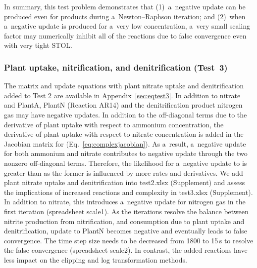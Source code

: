 \documentclass[gmdd, online, hvmath]{copernicus}
\begin{document}
      In summary, this test problem demonstrates that (1)~a~negative update
      can be produced even for products during a~Newton--Raphson iteration;
      and (2)~when a~negative update is produced for a~very low
      concentration, a~very small scaling factor may numerically inhibit all
      of the reactions due to false convergence even with very tight STOL.




\subsubsection*{Plant uptake, nitrification, and denitrification (Test~3)}

      The matrix and update equations with plant nitrate uptake and
      denitrification added to Test 2 are available in
      Appendix~\ref{sec:eqtest3}. In addition to nitrate and PlantA, PlantN  (Reaction AR14)
      and the denitrification product nitrogen gas may have negative
      updates. In addition to the off-diagonal terms due to the derivative
      of plant uptake with respect to ammonium concentration, the derivative
      of plant uptake with respect to nitrate concentration is added in the
      Jacobian matrix for  (Eq.~\ref{eq:complexjacobian}). As
      a~result, a~negative update for both ammonium and nitrate contributes
      to negative  update through the two nonzero off-diagonal
      terms.  Therefore, the likelihood for a~negative update to
       is greater than  as the former is
      influenced by more rates and derivatives. We add plant nitrate uptake
      and denitrification into test2.xlsx (Supplement) and assess the implications of
      increased reactions and complexity in test3.xlsx (Supplement). In addition to
      nitrate, this introduces a~negative update for nitrogen gas in the
      first iteration (spreadsheet scale1).  As the iterations resolve the
      balance between nitrite production from nitrification, and consumption
      due to plant uptake and denitrification, update to PlantN becomes
      negative and eventually leads to false convergence. The time step size
      needs to be decreased from 1800 to 15\,\unit{s} to resolve the false
      convergence (spreadsheet scale2). In contrast, the added reactions
      have less impact on the clipping and log transformation methods.
\end{document}
